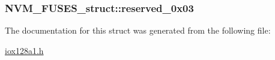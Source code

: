 \label{struct_n_v_m___f_u_s_e_s__struct_af6e518b1b1550cd51e69b7ca1cb14733}
\hypertarget{struct_n_v_m___f_u_s_e_s__struct_a45b60c8b16424759a7849796eb08c25a}{
\subsubsection[{reserved\_\-0x03}]{ {\bf NVM\_\-FUSES\_\-struct::reserved\_\-0x03}}}
\label{struct_n_v_m___f_u_s_e_s__struct_a45b60c8b16424759a7849796eb08c25a}


The documentation for this struct was generated from the following file:\begin{DoxyCompactItemize}
\item 
\hyperlink{iox128a1_8h}{iox128a1.h}\end{DoxyCompactItemize}
